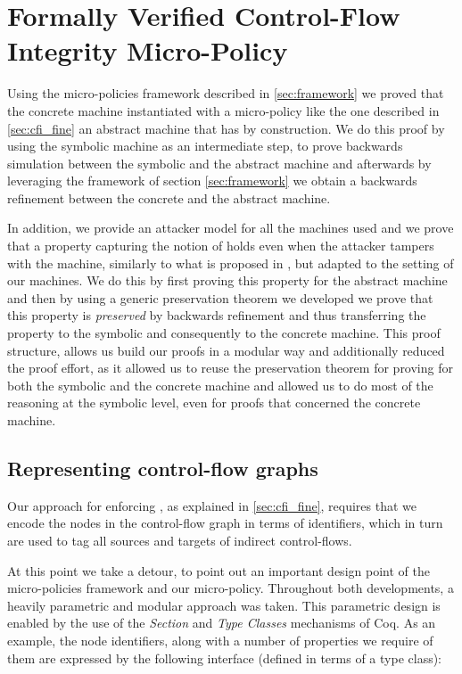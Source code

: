 \chapter{Formally Verified Control-Flow Integrity Micro-Policy}
\label{ch:verified_cfi}

Using the micro-policies framework described in \ref{sec:framework} we
proved that the concrete machine instantiated with a \CFI micro-policy
like the one described in \ref{sec:cfi_fine}  an
abstract machine that has \CFI by construction. We do this proof by
using the symbolic machine as an intermediate step, to prove backwards
simulation between the symbolic and the abstract machine and
afterwards by leveraging the framework of section \ref{sec:framework}
we obtain a backwards refinement between the concrete and the abstract
machine.

In addition, we provide an attacker model for all the machines used
and we prove that a property capturing the notion of \CFI holds even
when the attacker tampers with the machine, similarly to what is
proposed in \cite{AbadiBEL09}, but adapted to the setting of our
machines. We do this by first proving this property for the abstract
machine and then by using a generic preservation theorem we developed
we prove that this property is \emph{preserved} by backwards
refinement and thus transferring the property to the symbolic and
consequently to the concrete machine. This proof structure, allows us
build our proofs in a modular way and additionally reduced the proof
effort, as it allowed us to reuse the preservation theorem for proving
\CFI for both the symbolic and the concrete machine and allowed us to
do most of the reasoning at the symbolic level, even for proofs that
concerned the concrete machine.


\section{Representing control-flow graphs}\label{sec:cfi_tags}

Our approach for enforcing \CFI, as explained in \ref{sec:cfi_fine},
requires that we encode the nodes in the control-flow graph in terms
of identifiers, which in turn are used to tag all sources and targets
of indirect control-flows.

At this point we take a detour, to point out an important design point
of the micro-policies framework and our \CFI micro-policy.  Throughout
both developments, a heavily parametric and modular approach was
taken. This parametric design is enabled by the use of the
\emph{Section} and \emph{Type Classes} mechanisms of Coq. As an
example, the node identifiers, along with a number of properties we
require of them are expressed by the following interface (defined in
terms of a type class):


